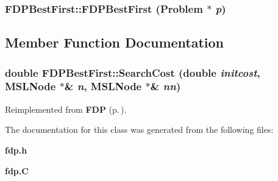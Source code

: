 \subsubsection{\setlength{\rightskip}{0pt plus 5cm}FDPBest\-First::FDPBest\-First ({\bf Problem} $\ast$ {\em p})}\label{classFDPBestFirst_a0}




\subsection{Member Function Documentation}
\subsubsection{\setlength{\rightskip}{0pt plus 5cm}double FDPBest\-First::Search\-Cost (double {\em initcost}, {\bf MSLNode} $\ast$\& {\em n}, {\bf MSLNode} $\ast$\& {\em nn})\hspace{0.3cm}{\tt  [protected, virtual]}}\label{classFDPBestFirst_b0}




Reimplemented from {\bf FDP} {\rm (p.\,\pageref{classFDP_b0})}.

The documentation for this class was generated from the following files:\begin{CompactItemize}
\item 
{\bf fdp.h}\item 
{\bf fdp.C}\end{CompactItemize}
